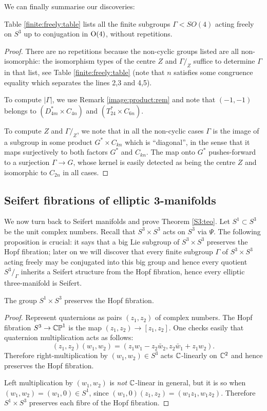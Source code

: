 We can finally summarise our discoveries:

\begin{cor} 
Table \ref{finite:freely:table} lists all the finite subgroups $\Gamma < SO(4)$ acting freely on $S^3$ up to conjugation in ${\rm O}(4)$, without repetitions. 
\end{cor}
\begin{proof}
There are no repetitions because the non-cyclic groups listed are all non-isomorphic: the isomorphism types of the centre $Z$ and $\Gamma/_Z$ suffice to determine $\Gamma$ in that list, see Table \ref{finite:freely:table} (note that $n$ satisfies some congruence equality which separates the lines 2,3 and 4,5).

To compute $|\Gamma|$, we use Remark \ref{image:product:rem} and note that $(-1,-1)$ belongs to $(D_{4m}^* \times C_{4n})$ and $(T_{24}^* \times C_{6n})$.

To compute $Z$ and $\Gamma/_Z$, we note that in all the non-cyclic cases $\Gamma$ is the image of a subgroup in some product $G^* \times C_{kn}$ which is ``diagonal'', in the sense that it maps surjectively to both factors $G^*$ and $C_{kn}$. The map onto $G^*$ pushes-forward to a surjection $\Gamma \to G$, whose kernel is easily detected as being the centre $Z$ and isomorphic to $C_{2n}$ in all cases.
\end{proof}


\subsection{Seifert fibrations of elliptic 3-manifolds}
We now turn back to Seifert manifolds and prove Theorem \ref{S3:teo}. Let $S^1\subset S^3$ be the unit complex numbers. Recall that $S^3\times S^3$ acts on $S^3$ via $\Psi$. The following proposition is crucial: it says that a big Lie subgroup of $S^3\times S^3$ preserves the Hopf fibration; later on we will discover that every finite subgroup $\Gamma$ of $S^3\times S^3$ acting freely may be conjugated into this big group and hence every quotient $S^3/_\Gamma$ inherits a Seifert structure from the Hopf fibration, hence every elliptic three-manifold is Seifert. 

\begin{prop}
The group $S^1\times S^3$ preserves the Hopf fibration.
\end{prop}
\begin{proof}
Represent quaternions as pairs $(z_1,z_2)$ of complex numbers. The Hopf fibration $S^3 \to \mathbb{CP}^1$ is the map $(z_1,z_2) \to [z_1,z_2]$. 
One checks easily that quaternion multiplication acts as follows:
$$(z_1, z_2) (w_1,w_2) = (z_1w_1 - z_2 \bar{w}_2, z_2 \bar{w}_1 + z_1w_2).$$
Therefore right-multiplication by $(w_1,w_2)\in S^3$ acts $\mathbb{C}$-linearly on $\mathbb{C}^2$ and hence preserves the Hopf fibration.

Left multiplication by $(w_1,w_2)$ is \emph{not} $\mathbb{C}$-linear in general, but it is so when $(w_1,w_2) = (w_1,0) \in S^1$, since $(w_1,0)(z_1,z_2) = (w_1z_1, w_1z_2).$
Therefore $S^1\times S^3$ preserves each fibre of the Hopf fibration.
\end{proof}

